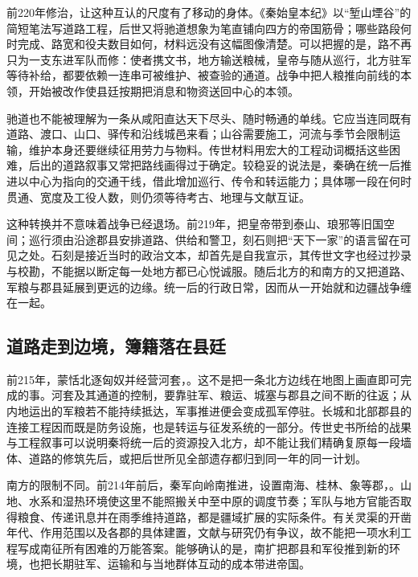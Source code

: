 前220年修治，让这种互认的尺度有了移动的身体。《秦始皇本纪》以“堑山堙谷”的简短笔法写道路工程，后世又将驰道想象为笔直铺向四方的帝国筋骨；哪些路段何时完成、路宽和役夫数目如何，材料远没有这幅图像清楚。可以把握的是，路不再只为一支东进军队而修：使者携文书，地方输送粮械，皇帝与随从巡行，北方驻军等待补给，都要依赖一连串可被维护、被查验的通道。战争中把人粮推向前线的本领，开始被改作使县廷按期把消息和物资送回中心的本领。

驰道也不能被理解为一条从咸阳直达天下尽头、随时畅通的单线。它应当连同既有道路、渡口、山口、驿传和沿线城邑来看；山谷需要施工，河流与季节会限制运输，维护本身还要继续征用劳力与物料。传世材料用宏大的工程动词概括这些困难，后出的道路叙事又常把路线画得过于确定。较稳妥的说法是，秦确在统一后推进以中心为指向的交通干线，借此增加巡行、传令和转运能力；具体哪一段在何时贯通、宽度及工役人数，则仍须等待考古、地理与文献互证。

这种转换并不意味着战争已经退场。前219年，把皇帝带到泰山、琅邪等旧国空间；巡行须由沿途郡县安排道路、供给和警卫，刻石则把“天下一家”的语言留在可见之处。石刻是接近当时的政治文本，却首先是自我宣示，其传世文字也经过抄录与校勘，不能据以断定每一处地方都已心悦诚服。随后北方的和南方的又把道路、军粮与郡县延展到更远的边缘。统一后的行政日常，因而从一开始就和边疆战争缠在一起。

\subsection{道路走到边境，簿籍落在县廷}

前215年，蒙恬北逐匈奴并经营河套，。这不是把一条北方边线在地图上画直即可完成的事。河套及其通道的控制，要靠驻军、粮运、城塞与郡县之间不断的往返；从内地运出的军粮若不能持续抵达，军事推进便会变成孤军停驻。长城和北部郡县的连接工程因而既是防务设施，也是转运与征发系统的一部分。传世史书所给的战果与工程叙事可以说明秦将统一后的资源投入北方，却不能让我们精确复原每一段墙体、道路的修筑先后，或把后世所见全部遗存都归到同一年的同一计划。

南方的限制不同。前214年前后，秦军向岭南推进，设置南海、桂林、象等郡，。山地、水系和湿热环境使这里不能照搬关中至中原的调度节奏；军队与地方官能否取得粮食、传递讯息并在雨季维持道路，都是疆域扩展的实际条件。有关灵渠的开凿年代、作用范围以及各郡的具体建置，文献与研究仍有争议，故不能把一项水利工程写成南征所有困难的万能答案。能够确认的是，南扩把郡县和军役推到新的环境，也把长期驻军、运输和与当地群体互动的成本带进帝国。

